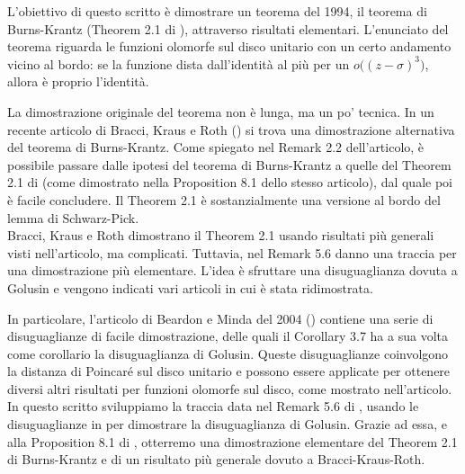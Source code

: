L'obiettivo di questo scritto è dimostrare un teorema del 1994, il teorema di Burns-Krantz (Theorem 2.1 di \cite{BK}), attraverso risultati elementari. L'enunciato del teorema riguarda le funzioni olomorfe sul disco unitario con un certo andamento vicino al bordo: se la funzione dista dall'identità al più per un $o\bigl((z-\sigma)^3\bigr)$, allora è proprio l'identità.

La dimostrazione originale del teorema non è lunga, ma un po' tecnica. In un recente articolo di Bracci, Kraus e Roth (\cite{BKR}) si trova una dimostrazione alternativa del teorema di Burns-Krantz. Come spiegato nel Remark 2.2 dell'articolo, è possibile passare dalle ipotesi del teorema di Burns-Krantz a quelle del Theorem 2.1 di \cite{BKR} (come dimostrato nella Proposition 8.1 dello stesso articolo), dal quale poi è facile concludere. Il Theorem 2.1 è sostanzialmente una versione al bordo del lemma di Schwarz-Pick. \\

Bracci, Kraus e Roth dimostrano il Theorem 2.1 usando risultati più generali visti nell'articolo, ma complicati. Tuttavia, nel Remark 5.6 danno una traccia per una dimostrazione più elementare. L'idea è sfruttare una disuguaglianza dovuta a Golusin e vengono indicati vari articoli in cui è stata ridimostrata.

In particolare, l'articolo di Beardon e Minda del 2004 (\cite{BM}) contiene una serie di disuguaglianze di facile dimostrazione, delle quali il Corollary 3.7 ha a sua volta come corollario la disuguaglianza di Golusin. Queste disuguaglianze coinvolgono la distanza di Poincaré sul disco unitario e possono essere applicate per ottenere diversi altri risultati per funzioni olomorfe sul disco, come mostrato nell'articolo. \\

In questo scritto sviluppiamo la traccia data nel Remark 5.6 di \cite{BKR}, usando le disuguaglianze in \cite{BM} per dimostrare la disuguaglianza di Golusin. Grazie ad essa, e alla Proposition 8.1 di \cite{BKR}, otterremo una dimostrazione elementare del Theorem 2.1 di Burns-Krantz e di un risultato più generale dovuto a Bracci-Kraus-Roth.

